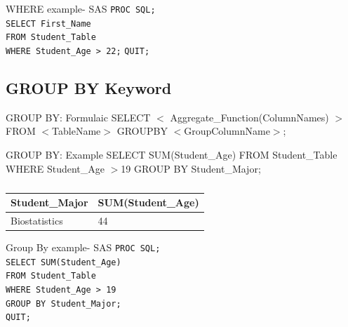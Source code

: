 \documentclass[handout]{beamer}
\begin{document}
	\begin{frame}{WHERE example- SAS}
		\texttt{PROC SQL;} \\
		\texttt{SELECT First\_Name } \\
		\texttt{FROM Student\_Table}\\
		\texttt{WHERE Student\_Age > 22;} 
		\texttt{QUIT;}
	\end{frame}
		\subsection{GROUP BY Keyword}
		\begin{frame}
		\begin{block}{GROUP BY: Formulaic}
			SELECT $<$ Aggregate\_Function(ColumnNames) $>$ FROM $<$TableName$>$ GROUPBY $<$GroupColumnName$>$;
		\end{block}
		\begin{block}{GROUP BY: Example}
			SELECT SUM(Student\_Age) FROM Student\_Table WHERE Student\_Age $>$19 GROUP BY Student\_Major;
		\end{block}
		\begin{table}[H]
			\centering
			\caption*{}

			\begin{tabular}{|l|l|}
				\hline
				Student\_Major & SUM(Student\_Age)  \\ \hline
				Biostatistics  & 44 \\ \hline 
			\end{tabular}
		\end{table}			
		\end{frame}
		
	\begin{frame}{Group By example- SAS}
		\texttt{PROC SQL;} \\
		\texttt{SELECT SUM(Student\_Age) } \\
		\texttt{FROM Student\_Table}\\
		\texttt{WHERE Student\_Age > 19  } \\
		\texttt{GROUP BY Student\_Major;} \\
		\texttt{QUIT;}
	\end{frame}
\end{document}
